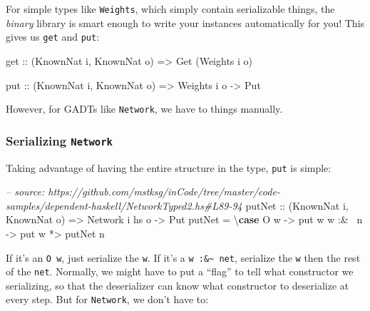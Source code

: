 \documentclass[]{article}
\newenvironment{Shaded}{}{}
\newcommand{\KeywordTok}[1]{\textcolor[rgb]{0.00,0.44,0.13}{\textbf{{#1}}}}
\newcommand{\DataTypeTok}[1]{\textcolor[rgb]{0.56,0.13,0.00}{{#1}}}
\newcommand{\CommentTok}[1]{\textcolor[rgb]{0.38,0.63,0.69}{\textit{{#1}}}}
\newcommand{\OtherTok}[1]{\textcolor[rgb]{0.00,0.44,0.13}{{#1}}}
\newcommand{\FunctionTok}[1]{\textcolor[rgb]{0.02,0.16,0.49}{{#1}}}
\newcommand{\NormalTok}[1]{{#1}}
\begin{document}
For simple types like \texttt{Weights}, which simply contain serializable
things, the \emph{binary} library is smart enough to write your instances
automatically for you! This gives us \texttt{get} and \texttt{put}:

\begin{Shaded}
\begin{Highlighting}[]
\OtherTok{get ::} \NormalTok{(}\DataTypeTok{KnownNat} \NormalTok{i, }\DataTypeTok{KnownNat} \NormalTok{o)}
    \OtherTok{=>} \DataTypeTok{Get} \NormalTok{(}\DataTypeTok{Weights} \NormalTok{i o)}

\OtherTok{put ::} \NormalTok{(}\DataTypeTok{KnownNat} \NormalTok{i, }\DataTypeTok{KnownNat} \NormalTok{o)}
    \OtherTok{=>} \DataTypeTok{Weights} \NormalTok{i o}
    \OtherTok{->} \DataTypeTok{Put}
\end{Highlighting}
\end{Shaded}

However, for GADTs like \texttt{Network}, we have to things manually.

\subsubsection{\texorpdfstring{Serializing
\texttt{Network}}{Serializing Network}}\label{serializing-network}

Taking advantage of having the entire structure in the type, \texttt{put} is
simple:

\begin{Shaded}
\begin{Highlighting}[]
\CommentTok{-- source: https://github.com/mstksg/inCode/tree/master/code-samples/dependent-haskell/NetworkTyped2.hs#L89-94}
\OtherTok{putNet ::} \NormalTok{(}\DataTypeTok{KnownNat} \NormalTok{i, }\DataTypeTok{KnownNat} \NormalTok{o)}
       \OtherTok{=>} \DataTypeTok{Network} \NormalTok{i hs o}
       \OtherTok{->} \DataTypeTok{Put}
\NormalTok{putNet }\FunctionTok{=} \NormalTok{\textbackslash{}}\KeywordTok{case}
    \DataTypeTok{O} \NormalTok{w     }\OtherTok{->} \NormalTok{put w}
    \NormalTok{w }\FunctionTok{:&~} \NormalTok{n }\OtherTok{->} \NormalTok{put w }\FunctionTok{*>} \NormalTok{putNet n}
\end{Highlighting}
\end{Shaded}

If it's an \texttt{O\ w}, just serialize the \texttt{w}. If it's a
\texttt{w\ :\&\textasciitilde{}\ net}, serialize the \texttt{w} then the rest of
the \texttt{net}. Normally, we might have to put a ``flag'' to tell what
constructor we serializing, so that the deserializer can know what constructor
to deserialize at every step. But for \texttt{Network}, we don't have to:
\end{document}
